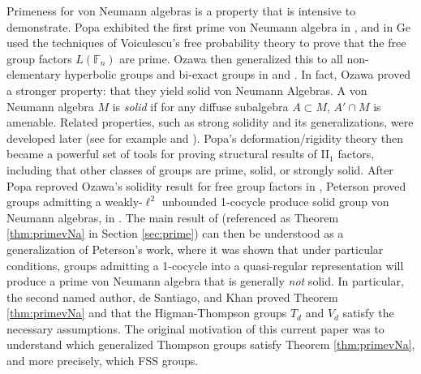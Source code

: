 \documentclass[12pt]{amsart}
\numberwithin{equation}{subsection}
\theoremstyle{definition}
\theoremstyle{definition}
\theoremstyle{remark}
\begin{document}
Primeness for von Neumann algebras is a property that is intensive to demonstrate. Popa exhibited the first prime von Neumann algebra in \cite{popa1983orthogonal}, and in \cite{Liming1996} Ge used the techniques of Voiculescu's free probability theory to prove that the free group factors $L(\mathbb F_n)$ are prime. Ozawa then generalized this to all non-elementary hyperbolic groups and bi-exact groups in \cite{ozawa2004solid} and \cite{BrownOzawa2008}. In fact, Ozawa proved a stronger property: that they yield solid von Neumann Algebras. A von Neumann algebra $M$ is \emph{solid} if for any diffuse subalgebra $A \subset M$, $A'\cap M$ is amenable. Related properties, such as strong solidity and its generalizations, were developed later (see for example \cite{ozawapopa2010} and \cite{hayes2025consequences}). Popa's deformation/rigidity theory then became a powerful set of tools for proving structural results of II$_1$ factors, including that other classes of groups are prime, solid, or strongly solid. After Popa reproved Ozawa's solidity result for free group factors in \cite{popa2007OzawasPropforFree}, Peterson proved groups admitting a weakly-$\ell^2$ unbounded 1-cocycle produce solid group von Neumann algebras, in \cite{peterson2009}. The main result of \cite{de2023mcduff} (referenced as Theorem \ref{thm:primevNa} in Section \ref{sec:prime}) can then be understood as a generalization of Peterson's work, where it was shown that under particular conditions, groups admitting a 1-cocycle into a quasi-regular representation will produce a prime von Neumann algebra that is generally \emph{not} solid. In particular, the second named author, de Santiago, and Khan proved Theorem \ref{thm:primevNa} and that the Higman-Thompson groups $T_d$ and $V_d$ satisfy the necessary assumptions. The original motivation of this current paper was to understand which generalized Thompson groups satisfy Theorem \ref{thm:primevNa}, and more precisely, which FSS groups. 
\end{document}
